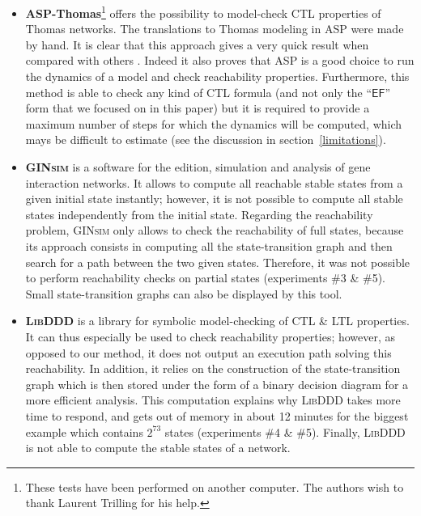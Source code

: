 \begin{itemize}

\item \textbf{ASP-Thomas}\footnote{These tests have been performed on another computer. The authors wish to thank Laurent Trilling for his help.}
offers the possibility to model-check CTL properties
of Thomas networks.
The translations to Thomas modeling in ASP were made by hand.
It is clear that this approach gives a very quick result when compared with others
.
Indeed it also proves that ASP is a good choice to run the dynamics of a model and check reachability properties.
Furthermore, this method is able to check any kind of CTL formula
(and not only the “$\mathsf{EF}$” form that we focused on in this paper)
but it is required to provide a maximum number of steps
for which the dynamics will be computed, which mays be difficult to estimate
(see the discussion in section~\ref{limitations}).

\item \textbf{\textsc{GINsim}} is a software for the edition, simulation and analysis
of gene interaction networks.
It allows to compute all reachable stable states from a given initial state instantly;
however, it is not possible to compute all stable states independently from the initial state.
Regarding the reachability problem, \textsc{GINsim} only allows to check the reachability of
full states, because its approach consists in computing
all the state-transition graph and then search for a path between the two given states.
Therefore, it was not possible to perform reachability checks on partial states
(experiments \#3 \& \#5).
Small state-transition graphs can also be displayed by this tool.

\item \textbf{\textsc{LibDDD}}
is a library for symbolic model-checking of CTL \& LTL properties.
It can thus especially be used to check reachability properties;
however, as opposed to our method, it does not output an execution path
solving this reachability.
In addition, it relies on the construction of the state-transition graph
which is then stored under the form of a binary decision diagram for a more efficient analysis.
This computation explains why \textsc{LibDDD} takes more time to respond,
and gets out of memory in about 12 minutes for the biggest example
which contains $2^{73}$ states
(experiments \#4 \& \#5).
Finally, \textsc{LibDDD} is not able to compute the stable states of a network.


\end{itemize}
